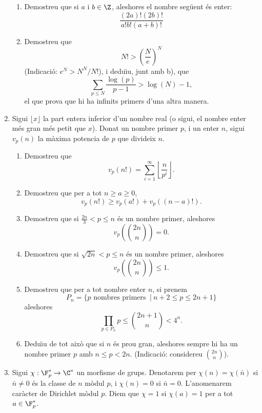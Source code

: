 \begin{enumerate}[leftmargin=*]
\begin{enumerate}
\item   Demostreu que si $a$ i $b\in\Z$, aleshores el nombre
seg\"{u}ent és enter: $$ \frac{(2a)!(2b)!}{a!b!(a+b)!}$$

\item  Demostreu que
$$N!>\left( \frac {N}{e}\right)^N$$
(Indicació: $e^N>N^N/N!$), i dedu\"{\i}u, junt amb b), que $$\sum_{p\le
N} \frac{\log(p)}{p-1} > \log(N)-1,$$ el que prova que hi ha
infinits primers d'una altra manera.

\end{enumerate}


\item Sigui $\lfloor x \rfloor$ la part entera inferior d'un
nombre real (o sigui, el nombre enter més gran més petit que $x$).
Donat un nombre primer $p$, i un enter $n$, sigui $v_p(n)$ la màxima
potencia de $p$ que divideix $n$.

\begin{enumerate}


\item  Demostreu que $$v_p(n!)=\sum_{i=1}^{\infty} \left\lfloor
\frac n{p^i}\right\rfloor.$$

\item  Demostreu que per a tot $n\ge a\ge 0$,  $$v_p(n!)\ge
v_p(a!)+v_p((n-a)!).$$

\item  Demostreu que si  $\frac{2n}3< p\le n$ és un nombre
primer, aleshores $$v_p(\binom{2n}{n})=0.$$

\item  Demostreu que si  $\sqrt{2n}< p\le n$ és un nombre
primer, aleshores $$v_p(\binom{2n}{n})\le 1.$$

\item  Demostreu que per a tot nombre enter $n$, si prenem
\[
P_n=\{p \mbox{ nombres primers } \ | \ n+2\le p \le 2n+1\}
\]
aleshores
\[
\prod_{p\in P_n} p \le \binom{2n+1}{n}< 4^n.
\]

\item  Dedu\"{\i}u de tot això que si $n$ és prou gran,
aleshores sempre hi ha un nombre primer $p$ amb $n\le p<2n$.
(Indicació: considereu $\binom{2n}{n}$).

\end{enumerate}


\item Sigui $\chi:\F_p^* \to \C^*$ un morfisme de grups.
Denotarem per $\chi(n)=\chi(\bar n)$ si $\bar n\ne 0$ és la classe
de $n$ mòdul $p$, i $\chi(n)=0$ si $\bar n=0$. L'anomenarem caràcter
de Dirichlet mòdul $p$. Diem que $\chi=1$ si $\chi(a)=1$ per a tot
$a\in \F_p^*$.


\end{enumerate}
